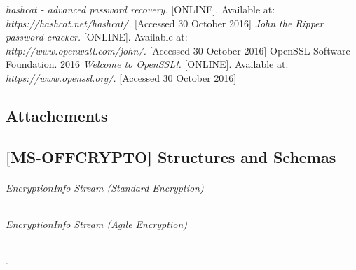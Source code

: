 \documentclass[11pt,oneside]{fithesis2}
\begin{document}
\begin{thebibliography}{}
	\textit{hashcat - advanced password recovery.} [ONLINE].
Available at: \\ \textit{https://hashcat.net/hashcat/.} [Accessed 30 October 2016]
	\textit{John the Ripper password cracker.} [ONLINE].
Available at: \\ \textit{http://www.openwall.com/john/.} [Accessed 30 October 2016]
	OpenSSL Software Foundation. 2016 \textit{Welcome to OpenSSL!.} [ONLINE].
Available at: \\ \textit{https://www.openssl.org/.} [Accessed 30 October 2016]
\end{thebibliography}





\begin{appendix}
	\chapter{Attachements}
	\section{[MS-OFFCRYPTO] Structures and Schemas}\label{msoffcrypto_structs}
	\subparagraph{EncryptionInfo Stream (Standard Encryption)}\label{ei_standardstream}

	\subparagraph{EncryptionInfo Stream (Agile Encryption)}\label{ei_agilestream}.
\end{appendix}
\end{document}
